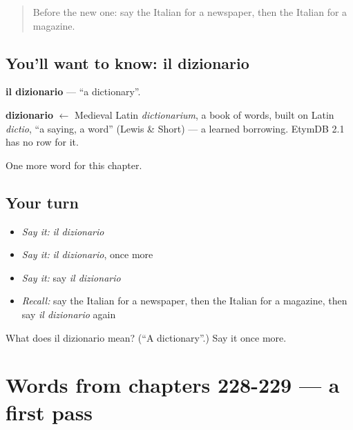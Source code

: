 \label{lesson:IT-C232-dizionario}



\begin{quote}
Before the new one: say the Italian for a newspaper, then the Italian for a magazine.
\end{quote}

\subsection*{You'll want to know: il dizionario}
\textbf{il dizionario} — \textquotedblleft{}a dictionary\textquotedblright{}.

\begin{cousinweb}
\textbf{dizionario} $\leftarrow$ Medieval Latin \emph{dictionarium}, a book of words, built on Latin \emph{dictio}, \textquotedblleft{}a saying, a word\textquotedblright{} (Lewis \& Short) — a learned borrowing. EtymDB 2.1 has no row for it.
\end{cousinweb}

\begin{grammarlens}[title={What you've built}]
One more word for this chapter.
\end{grammarlens}

\subsection*{Your turn}
\begin{itemize}
\raggedright
  \item \emph{Say it:} \emph{il dizionario}
  \item \emph{Say it:} \emph{il dizionario}, once more
  \item \emph{Say it:} say \emph{il dizionario}
  \item \emph{Recall:} say the Italian for a newspaper, then the Italian for a magazine, then say \emph{il dizionario} again
\end{itemize}

\begin{tcolorbox}[breakable,colback=teal!4,colframe=teal!35!black,title={Before you move on}]
What does il dizionario mean? (\textquotedblleft{}A dictionary\textquotedblright{}.) Say it once more.
\end{tcolorbox}
\section[(dialogue)]{Words from chapters 228-229 — a first pass}

